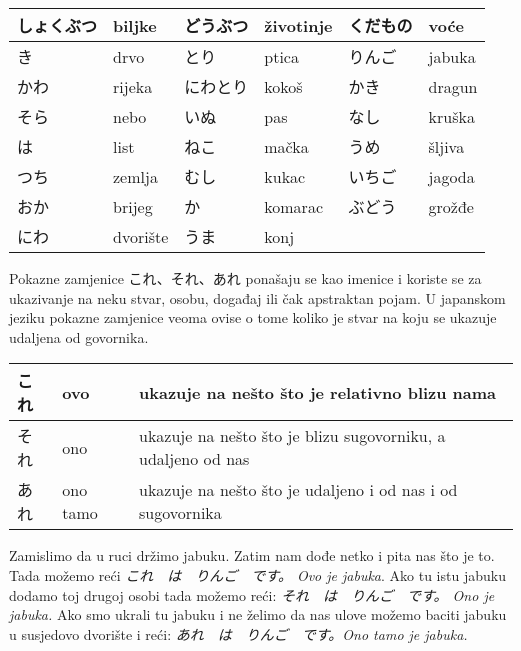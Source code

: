 
\author{Tomislav Mamić, Željka Ludošan}


	
	\vspace{10pt}
	\begin{tabular}{|l|l|l||l||l||l|}
		\hline
		しょくぶつ&biljke&どうぶつ&životinje&くだもの&voće\\\hline
		き&drvo&とり&ptica&りんご&jabuka\\\hline
		かわ&rijeka&にわとり&kokoš&かき&dragun\\\hline
		そら&nebo&いぬ&pas&なし&kruška\\\hline
		は&list&ねこ&mačka&うめ&šljiva\\\hline
		つち&zemlja&むし&kukac&いちご&jagoda\\\hline
		おか&brijeg&か&komarac&ぶどう&grožđe\\\hline
		にわ&dvorište&うま&konj&&\\\hline
	\end{tabular}
	\vspace{10pt}

	

	Pokazne zamjenice これ、それ、あれ ponašaju se kao imenice i koriste se za ukazivanje na neku stvar, osobu, događaj ili čak apstraktan pojam. U japanskom jeziku pokazne zamjenice veoma ovise o tome koliko je stvar na koju se ukazuje udaljena od govornika.
	
	\vspace{10pt}
	\begin{tabular}{|l|l|l|}
		\hline
		これ&ovo&ukazuje na nešto što je relativno blizu nama\\\hline
		それ&ono&ukazuje na nešto što je blizu sugovorniku, a udaljeno od nas\\\hline
		あれ&ono tamo&ukazuje na nešto što je udaljeno i od nas i od sugovornika\\\hline
	\end{tabular}
	\vspace{10pt}
	
	Zamislimo da u ruci držimo jabuku. Zatim nam dođe netko i pita nas što je to.
	Tada možemo reći \textit{これ　は　りんご　です。 Ovo je jabuka}. Ako tu istu jabuku dodamo toj drugoj osobi tada možemo reći:	\textit{それ　は　りんご　です。 Ono je jabuka.} Ako smo ukrali tu jabuku i ne želimo da nas ulove možemo baciti jabuku u susjedovo dvorište i reći: \textit{あれ　は　りんご　です。Ono tamo je jabuka.}
	

